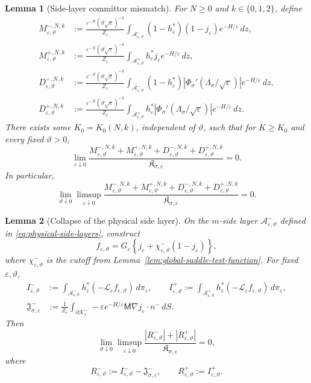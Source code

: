 \documentclass[10pt,a4paper]{amsart}
\newtheorem{lemma}{Lemma}
\newcommand{\calL}{\mathcal L}
\newcommand{\eps}{\varepsilon}
\begin{document}
\begin{lemma}[Side-layer committor mismatch]
\label{lem:side-layer-mismatch}
For $N\ge0$ and $k\in\{0,1,2\}$, define
\[
\begin{aligned}
M_{\eps,\vartheta}^{-,N,k}
&:=\frac{\eps^{-N}(\vartheta\sqrt\eps)^{-k}}{Z_\eps}
\int_{\mathcal A_{\eps,\vartheta}^-}
(1-h_\eps^*)(1-j_\eps)e^{-H/\eps}\,dz,\\
M_{\eps,\vartheta}^{+,N,k}
&:=\frac{\eps^{-N}(\vartheta\sqrt\eps)^{-k}}{Z_\eps}
\int_{\mathcal A_{\eps,\vartheta}^+}
h_\eps^*j_\eps e^{-H/\eps}\,dz,\\
D_{\eps,\vartheta}^{-,N,k}
&:=\frac{\eps^{-N}(\vartheta\sqrt\eps)^{-k}}{Z_\eps}
\int_{\mathcal A_{\eps,\vartheta}^-}
(1-h_\eps^*)
\left|\Phi_\sigma'(\Lambda_\sigma/\sqrt\eps)\right|
e^{-H/\eps}\,dz,\\
D_{\eps,\vartheta}^{+,N,k}
&:=\frac{\eps^{-N}(\vartheta\sqrt\eps)^{-k}}{Z_\eps}
\int_{\mathcal A_{\eps,\vartheta}^+}
h_\eps^*
\left|\Phi_\sigma'(\Lambda_\sigma/\sqrt\eps)\right|
e^{-H/\eps}\,dz.
\end{aligned}
\]
There exists some $K_0=K_0(N,k)$, independent of $\vartheta$, such that for
$K\ge K_0$ and every fixed $\vartheta>0$,
\[
\lim_{\eps\downarrow0}
\frac{M_{\eps,\vartheta}^{-,N,k}+M_{\eps,\vartheta}^{+,N,k}
+D_{\eps,\vartheta}^{-,N,k}+D_{\eps,\vartheta}^{+,N,k}}
{\mathfrak K_{\sigma,\eps}}=0.
\]
In particular,
\[
\lim_{\vartheta\downarrow0}\limsup_{\eps\downarrow0}
\frac{M_{\eps,\vartheta}^{-,N,k}+M_{\eps,\vartheta}^{+,N,k}
+D_{\eps,\vartheta}^{-,N,k}+D_{\eps,\vartheta}^{+,N,k}}
{\mathfrak K_{\sigma,\eps}}=0.
\]
\end{lemma}

\begin{lemma}[Collapse of the physical side layer]
\label{lem:collapse-physical-side-layer}
On the $m$-side layer $\mathcal A_{\eps,\vartheta}^-$ defined in
\eqref{eq:physical-side-layers},
construct
\[
f_{\eps,\vartheta}=G_\eps\left\{j_\eps+\chi_{\eps,\vartheta}^-(1-j_\eps)\right\},
\]
where $\chi_{\eps,\vartheta}^-$ is the cutoff from
Lemma~\ref{lem:global-saddle-test-function}.  For fixed $\eps,\vartheta$,
\[
\begin{aligned}
I_{\eps,\vartheta}^-
&:=\int_{\mathcal A_{\eps,\vartheta}^-}
h_\eps^*(-\calL_\eps f_{\eps,\vartheta})\,d\pi_\eps,
\qquad
I_{\eps,\vartheta}^+
:=\int_{\mathcal A_{\eps,\vartheta}^+}
h_\eps^*(-\calL_\eps f_{\eps,\vartheta})\,d\pi_\eps,\\
\mathfrak J_{\sigma,\eps}^-
&:=\frac1{Z_\eps}\int_{\partial\mathcal K_\eps^-}
-\eps e^{-H/\eps}\mathsf M\nabla j_\eps\cdot n^-\,dS.
\end{aligned}
\]
Then
\begin{equation}
\label{eq:side-collapse-ordered-remainder}
\lim_{\vartheta\downarrow0}\limsup_{\eps\downarrow0}
\frac{|R_{\eps,\vartheta}^-|+|R_{\eps,\vartheta}^+|}
{\mathfrak K_{\sigma,\eps}}=0,
\end{equation}
where
\[
R_{\eps,\vartheta}^-:=I_{\eps,\vartheta}^--\mathfrak J_{\sigma,\eps}^-,
\qquad
R_{\eps,\vartheta}^+:=I_{\eps,\vartheta}^+.
\]
\end{lemma}
\end{document}
